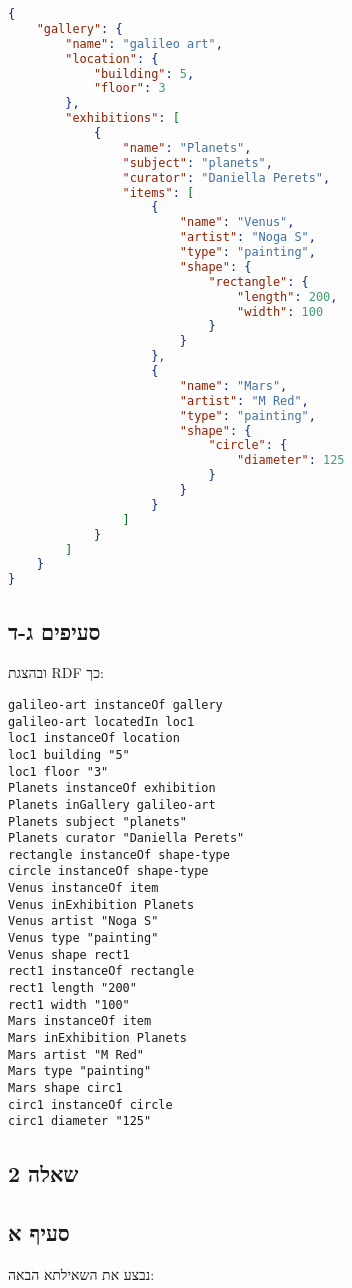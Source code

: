 \documentclass{article}
\begin{document}
\begin{lstlisting}[language=JSON]
    {
    "gallery": {
        "name": "galileo art",
        "location": {
            "building": 5,
            "floor": 3
        },
        "exhibitions": [
            {
                "name": "Planets",
                "subject": "planets",
                "curator": "Daniella Perets",
                "items": [
                    {
                        "name": "Venus",
                        "artist": "Noga S",
                        "type": "painting",
                        "shape": {
                            "rectangle": {
                                "length": 200,
                                "width": 100
                            }
                        }
                    },
                    {
                        "name": "Mars",
                        "artist": "M Red",
                        "type": "painting",
                        "shape": {
                            "circle": {
                                "diameter": 125
                            }
                        }
                    }
                ]
            }
        ]
    }
}
\end{lstlisting}

\pagebreak

\begin{hebrew}
    \subsection*{סעיפים ג-ד}
    ובהצגת RDF כך:
\end{hebrew}

\begin{lstlisting}[language=N3]
galileo-art instanceOf gallery
galileo-art locatedIn loc1
loc1 instanceOf location
loc1 building "5"
loc1 floor "3"
Planets instanceOf exhibition
Planets inGallery galileo-art
Planets subject "planets"
Planets curator "Daniella Perets"
rectangle instanceOf shape-type
circle instanceOf shape-type
Venus instanceOf item
Venus inExhibition Planets
Venus artist "Noga S"
Venus type "painting"
Venus shape rect1
rect1 instanceOf rectangle
rect1 length "200"
rect1 width "100"
Mars instanceOf item
Mars inExhibition Planets
Mars artist "M Red"
Mars type "painting"
Mars shape circ1
circ1 instanceOf circle
circ1 diameter "125"
\end{lstlisting}

\pagebreak

\begin{hebrew}
    \section*{שאלה 2}
    \subsection*{סעיף א}

    נבצע את השאילתא הבאה:
\end{hebrew}
\end{document}
